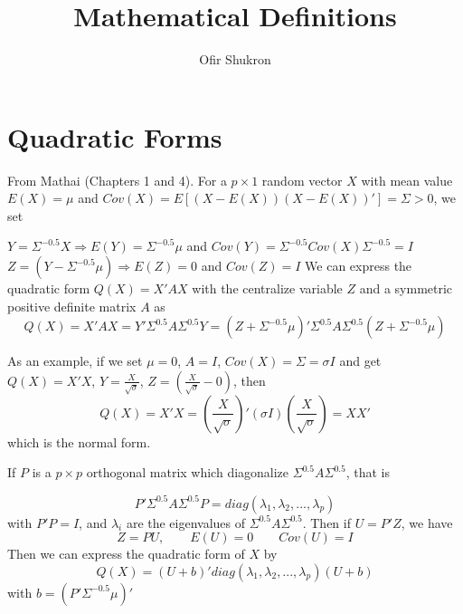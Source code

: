 \documentclass[12pt]{paper}
\begin{document}
\title{Mathematical Definitions}
\author{Ofir Shukron}
\maketitle
\section{Quadratic Forms}\label{section_quadraticForms}
From Mathai \cite{mathai1992quadratic}(Chapters 1 and 4). For a $p\times 1$ random vector $X$ with mean value $E(X)=\mu$ and $Cov(X)=E[(X-E(X))(X-E(X))']=\Sigma>0$, we set 

$ Y=\Sigma^{-0.5}X\Rightarrow E(Y)=\Sigma^{-0.5}\mu$ and $Cov(Y)=\Sigma^{-0.5}Cov(X)\Sigma^{-0.5}=I$
$Z=(Y-\Sigma^{-0.5}\mu)\Rightarrow E(Z)=0$ and $Cov(Z)=I$ 
We can express the quadratic form $Q(X) =X'AX$ with the centralize variable $Z$ and a symmetric positive definite matrix $A$ as
\begin{equation}
Q(X)=X'AX=Y'\Sigma^{0.5}A\Sigma^{0.5}Y = (Z+\Sigma^{-0.5}\mu)'\Sigma^{0.5}A\Sigma^{0.5}(Z+\Sigma^{-0.5}\mu)	
\end{equation}

As an example, if we set $\mu = 0$, $A=I$, $Cov(X)=\Sigma=\sigma I$ and get 
$Q(X)=X'X$, $Y = \frac{X}{\sqrt{\sigma}}$, $Z=(\frac{X}{\sqrt{\sigma}}-0)$, then 
\begin{equation}
Q(X)=X'X= (\frac{X}{\sqrt{\sigma}})'(\sigma I)(\frac{X}{\sqrt{\sigma}})=XX'	
\end{equation}
which is the normal form.

If $P$ is a $p \times p$ orthogonal matrix which diagonalize $\Sigma^{0.5}A\Sigma^{0.5}$, that is 

\begin{equation*}
P'\Sigma^{0.5}A\Sigma^{0.5}P = diag(\lambda_1,\lambda_2,...,\lambda_p)
\end{equation*}
with $P'P=I$, and $\lambda_i$ are the eigenvalues of $\Sigma^{0.5} A \Sigma^{0.5}$.  Then if $U=P'Z$, we have 
\begin{equation*}
Z=PU, \qquad E(U)=0 \qquad Cov(U) = I
\end{equation*}
Then we can express the quadratic form of $X$ by 
\begin{equation}
Q(X) = (U+b)'diag(\lambda_1,\lambda_2,...,\lambda_p)(U+b)
\end{equation}
with $b = (P'\Sigma^{-0.5}\mu)'$ 


\end{document}
